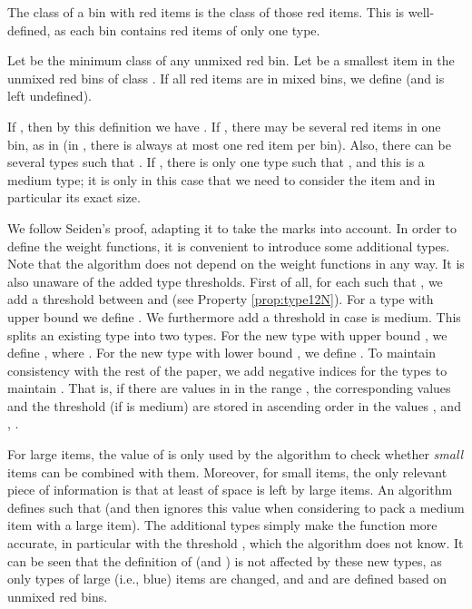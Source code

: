 The class of a bin with red items is the class of those red items.
This is well-defined, as each bin contains red items of only one type.

\begin{definition}
	\label{def:6}
	Let  be the minimum class of any unmixed red bin.
Let  be a smallest item in the unmixed red bins of class . If all red items are in mixed bins, we define  (and  is left undefined).
\end{definition}

If , then by this definition we have . 
If , there may be several red items in one bin,
as in {\SuperH} (in {\Hpp}, there is always at most one red item per bin).
Also, there can be several types  such that .
If , there is only one type  such that , and this is a medium type; it is only in this case that we need to consider the item  and in particular its exact size.

We follow Seiden's proof, adapting it to take the marks into account.
In order to define the weight functions, it is convenient to introduce some additional types.
Note that the algorithm does not depend on the weight functions in any way.
It is also unaware of the added type thresholds.
First of all, for each  such that ,
we add a threshold  between  and 
(see Property \ref{prop:type12N}).
For a type  with upper bound  we define
. We furthermore add a threshold  in case
 is medium.
This splits an existing type into two types.
For the new type  with upper bound , we define
, where .
For the new type  with lower bound , we define
.
To maintain consistency with the rest of the paper, 
we add negative indices for the types to maintain .
That is, if there are  values in  in the range ,
the corresponding values  and the threshold  
(if  is medium)
are stored in ascending order in the values , and , .



For large items, the value of  is only used by the algorithm to check whether \emph{small} items can be combined with them.
Moreover, for small items, the only relevant piece of information is that at least  of space is left by large items.
An {\EHarm} algorithm defines  such that  (and then ignores this value when considering to pack a medium item with a large item). The additional types simply make the function  more accurate, in particular with the threshold , which the algorithm does not know.
It can be seen that the definition of  (and ) is not affected by these new types, as only types of large (i.e., blue) items are changed, and  and  are defined based on unmixed red bins.

